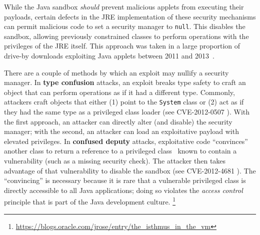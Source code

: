 \documentclass{sig-alternate}
\begin{document}
%
While the Java sandbox \textit{should} prevent malicious applets from
executing their payloads, certain defects in the JRE implementation of these security mechanisms can permit
malicious code to set a security manager to \texttt{null}.  
This disables the sandbox, allowing
previously constrained classes to perform operations with the privileges of 
the JRE itself. 
This approach was taken in a large proportion of drive-by downloads exploiting
Java applets between 2011 and 2013~\cite{fireeye_2013}. 
%

There are a couple of methods by which an exploit may nullify a security manager.
In \textbf{type confusion} attacks, an exploit breaks type
safety to craft an object that can perform operations as if it had
a different type.  Commonly, attackers craft objects that either
(1) point to the \texttt{System} class or (2) act as if they had
the same type as a privileged class loader (see CVE-2012-0507 \cite{_vulnerability_2012_0507}).
With the first approach, an attacker can directly alter (and disable) the
security manager; with the second, an attacker can load an exploitative
payload with elevated privileges.  In \textbf{confused deputy} attacks,
exploitative code ``convinces'' another 
class to return a reference to a privileged class~\cite{hardy_confused_1988}
known to contain a vulnerability (such as a missing security check).  The
attacker then takes advantage of that vulnerability to disable the sandbox 
(see CVE-2012-4681 \cite{_vulnerability_2012_4681}).
The ``convincing'' is necessary
because it is rare that a vulnerable privileged class is directly accessible
to all Java applications; doing so violates the \textit{access
control} principle that is part of the Java development culture.%
\footnote{\url{https://blogs.oracle.com/jrose/entry/the_isthmus_in_the_vm}%
} 
\end{document}
